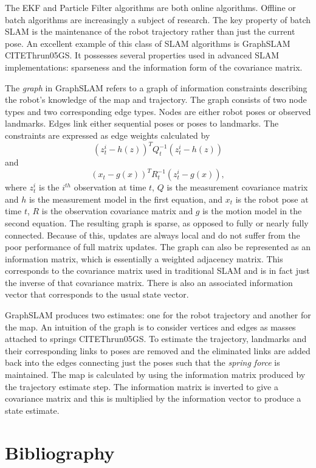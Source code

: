 \documentclass[12pt]{report}
\begin{document}
The EKF and Particle Filter algorithms are both online algorithms.  Offline or batch algorithms are increasingly a subject of research.  The key property of batch SLAM is the maintenance of the robot trajectory rather than just the current pose.   An excellent example of this class of SLAM algorithms is GraphSLAM CITE{Thrun05GS}.  It possesses several properties used in advanced SLAM implementations: sparseness and the information form of the covariance matrix.

The \emph{graph} in GraphSLAM refers to a graph of information constraints describing the robot's knowledge of the map and trajectory.  The graph consists of two node types and two corresponding edge types.  Nodes are either robot poses or observed landmarks.  Edges link either sequential poses or poses to landmarks.  The constraints are expressed as edge weights calculated by 
\begin{equation}\label{constraint1}
(z_{t}^{i} - h(z))^TQ_{t}^{-1}(z_{t}^{i} - h(z)) 
\end{equation}
and 
\begin{equation}\label{constraint2}
(x_{t} - g(x))^TR_{t}^{-1}(z_{t}^{i} - g(x)),
\end{equation}
 where $z_t^i$ is the $i^{th}$ observation at time $t$, $Q$ is the measurement covariance matrix and $h$ is the measurement model in the first equation, and $x_{t}$ is the robot pose at time $t$, $R$ is the observation covariance matrix and $g$ is the motion model in the second equation.  The resulting graph is sparse, as opposed to fully or nearly fully connected.  Because of this, updates are always local and do not suffer from the poor performance of full matrix updates.  The graph can also be represented as an information matrix, which is essentially a weighted adjacency matrix.  This corresponds to the covariance matrix used in traditional SLAM and is in fact just the inverse of that covariance matrix.  There is also an associated information vector that corresponds to the usual state vector.  

GraphSLAM produces two estimates: one for the robot trajectory and another for the map.  An intuition of the graph is to consider vertices and edges as masses attached to springs CITE{Thrun05GS}.  To estimate the trajectory, landmarks and their corresponding links to poses are removed and the eliminated links are added back into the edges connecting just the poses such that the \emph{spring force} is maintained.  The map is calculated by using the information matrix produced by the trajectory estimate step.  The information matrix is inverted to give a covariance matrix and this is multiplied by the information vector to produce a state estimate.  


\chapter{Bibliography}

{}
\end{document}

